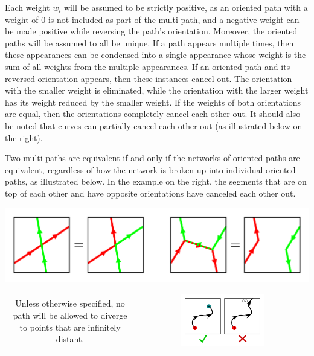Each weight \(w_i\) will be assumed to be strictly positive, as an oriented path with a weight of 0 is not included as part of the multi-path, and a negative weight can be made positive while reversing the path's orientation. Moreover, the oriented paths will be assumed to all be unique. If a path appears multiple times, then these appearances can be condensed into a single appearance whose weight is the sum of all weights from the multiple appearances. If an oriented path and its reversed orientation appears, then these instances cancel out. The orientation with the smaller weight is eliminated, while the orientation with the larger weight has its weight reduced by the smaller weight. If the weights of both orientations are equal, then the orientations completely cancel each other out. It should also be noted that curves can partially cancel each other out (as illustrated below on the right). 

Two multi-paths are equivalent if and only if the networks of oriented paths are equivalent, regardless of how the network is broken up into individual oriented paths, as illustrated below. In the example on the right, the segments that are on top of each other and have opposite orientations have canceled each other out.    
\begin{center}
\includegraphics[scale = 0.5]{Multi-structures/Multipaths/multi-path_decomposition}
\end{center}

\begin{center}
\begin{tabular}{cc}
\parbox{0.5\textwidth}{
Unless otherwise specified, no path will be allowed to diverge to points that are infinitely distant.
} & \parbox{0.5\textwidth}{
\includegraphics[width = 0.5\textwidth]{Multi-structures/Multipaths/no_infinite_paths}
}
\end{tabular}
\end{center}




